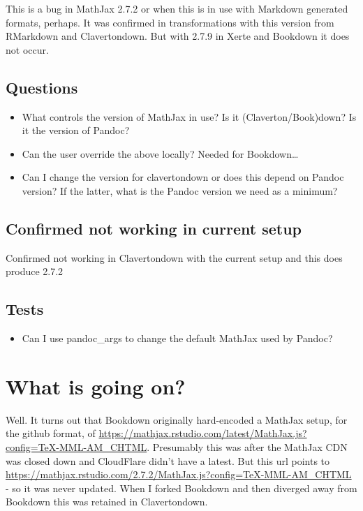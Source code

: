 \documentclass[
  10pt,
  a4paper]{article}
\providecommand{\tightlist}{%
  \setlength{\itemsep}{0pt}\setlength{\parskip}{0pt}}
\begin{document}
This is a bug in MathJax 2.7.2 or when this is in use with Markdown generated formats, perhaps. It was confirmed in transformations with this version from RMarkdown and Clavertondown. But with 2.7.9 in Xerte and Bookdown it does not occur.

\hypertarget{questions}{%
\subsection{Questions}\label{questions}}

\begin{itemize}
\tightlist
\item
  What controls the version of MathJax in use? Is it (Claverton/Book)down? Is it the version of Pandoc?
\item
  Can the user override the above locally? Needed for Bookdown\ldots{}
\item
  Can I change the version for clavertondown or does this depend on Pandoc version? If the latter, what is the Pandoc version we need as a minimum?
\end{itemize}

\hypertarget{confirmed-not-working-in-current-setup}{%
\subsection{Confirmed not working in current setup}\label{confirmed-not-working-in-current-setup}}

Confirmed not working in Clavertondown with the current setup and this does produce 2.7.2

\hypertarget{tests}{%
\subsection{Tests}\label{tests}}

\begin{itemize}
\tightlist
\item
  Can I use pandoc\_args to change the default MathJax used by Pandoc?
\end{itemize}

\hypertarget{what-is-going-on}{%
\section{What is going on?}\label{what-is-going-on}}

Well. It turns out that Bookdown originally hard-encoded a MathJax setup, for the github format, of \url{https://mathjax.rstudio.com/latest/MathJax.js?config=TeX-MML-AM_CHTML}. Presumably this was after the MathJax CDN was closed down and CloudFlare didn't have a latest. But this url points to \url{https://mathjax.rstudio.com/2.7.2/MathJax.js?config=TeX-MML-AM_CHTML} - so it was never updated. When I forked Bookdown and then diverged away from Bookdown this was retained in Clavertondown.
\end{document}
